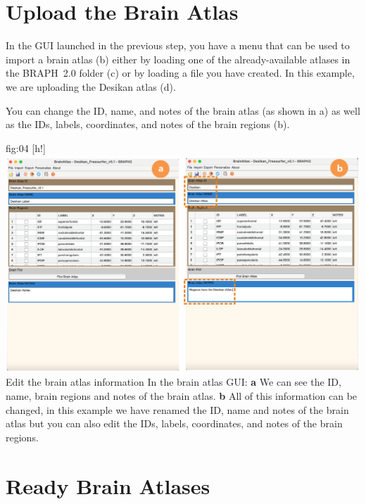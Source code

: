 \documentclass[justified]{tufte-handout}
\begin{document}
\clearpage
\section{Upload the Brain Atlas}

In the GUI launched in the previous step, you have a menu that can be used to import a brain atlas (b) either by loading one of the already-available atlases in the BRAPH~2.0 folder  (c) or by loading a file you have created. In this example, we are uploading the Desikan atlas (d).

You can change the ID, name, and notes of the brain atlas (as shown in a) as well as the IDs, labels, coordinates, and notes of the brain regions (b).
	
	{fig:04}
	{
	[h!]
	\includegraphics{fig04.png}
	}
	{Edit the brain atlas information}
	{
	In the brain atlas GUI: 
	{\bf a} We can see the ID, name, brain regions and notes of the brain atlas.
	{\bf b} All of this information can be changed, in this example we have renamed the ID, name and notes of the brain atlas but you can also edit the IDs, labels, coordinates, and notes of the brain regions.
	}

\section{Ready Brain Atlases}
\end{document}
